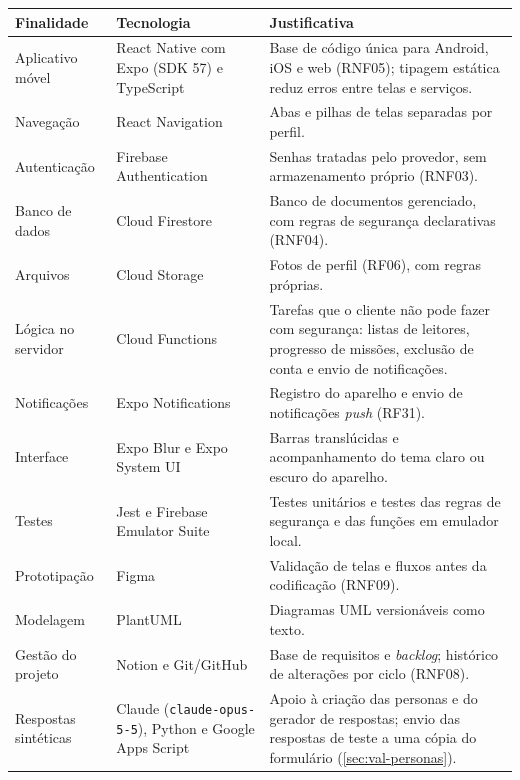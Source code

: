 \begin{quadro}[!htb]
  \caption{Tecnologias e ferramentas}
  \label{qua:tecnologias}
  \centering
  \footnotesize
  \begin{tabular}{|p{3.2cm}|p{4.0cm}|p{6.0cm}|}
    \hline
    \textbf{Finalidade} & \textbf{Tecnologia} & \textbf{Justificativa} \\ \hline
    Aplicativo móvel & React Native com Expo (SDK 57) e TypeScript & Base de código única para Android, iOS e web (RNF05); tipagem estática reduz erros entre telas e serviços. \\ \hline
    Navegação & React Navigation & Abas e pilhas de telas separadas por perfil. \\ \hline
    Autenticação & Firebase Authentication & Senhas tratadas pelo provedor, sem armazenamento próprio (RNF03). \\ \hline
    Banco de dados & Cloud Firestore & Banco de documentos gerenciado, com regras de segurança declarativas (RNF04). \\ \hline
    Arquivos & Cloud Storage & Fotos de perfil (RF06), com regras próprias. \\ \hline
    Lógica no servidor & Cloud Functions & Tarefas que o cliente não pode fazer com segurança: listas de leitores, progresso de missões, exclusão de conta e envio de notificações. \\ \hline
    Notificações & Expo Notifications & Registro do aparelho e envio de notificações \textit{push} (RF31). \\ \hline
    Interface & Expo Blur e Expo System UI & Barras translúcidas e acompanhamento do tema claro ou escuro do aparelho. \\ \hline
    Testes & Jest e Firebase Emulator Suite & Testes unitários e testes das regras de segurança e das funções em emulador local. \\ \hline
    Prototipação & Figma & Validação de telas e fluxos antes da codificação (RNF09). \\ \hline
    Modelagem & PlantUML & Diagramas UML versionáveis como texto. \\ \hline
    Gestão do projeto & Notion e Git/GitHub & Base de requisitos e \textit{backlog}; histórico de alterações por ciclo (RNF08). \\ \hline
    Respostas sintéticas & Claude (\texttt{claude-opus-5-5}), Python e Google Apps Script & Apoio à criação das personas e do gerador de respostas; envio das respostas de teste a uma cópia do formulário (\autoref{sec:val-personas}). \\ \hline
  \end{tabular}
\end{quadro}

